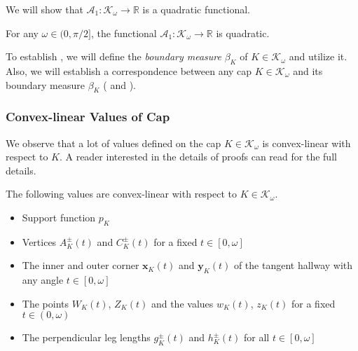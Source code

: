 We will show that \(\mathcal{A}_1 : \mathcal{K}_\omega \to \mathbb{R}\) is a quadratic functional.

\begin{theorem}

For any \(\omega \in (0, \pi/2]\), the functional \(\mathcal{A}_1 : \mathcal{K}_{\omega} \to \mathbb{R}\) is quadratic.

\label{thm:a1-quadratic}
\end{theorem}

To establish , we will define the \emph{boundary measure} \(\beta_K\) of \(K \in \mathcal{K}_\omega\) and utilize it. Also, we will establish a correspondence between any cap \(K \in \mathcal{K}_\omega\) and its boundary measure \(\beta_K\) ( and ).

\subsubsection{Convex-linear Values of Cap}

We observe that a lot of values defined on the cap \(K \in \mathcal{K}_\omega\) is convex-linear with respect to \(K\). A reader interested in the details of proofs can read  for the full details.

\begin{theorem}

The following values are convex-linear with respect to \(K \in \mathcal{K}_\omega\).

\begin{itemize}
\tightlist
\item
  Support function \(p_K\)
\item
  Vertices \(A^{\pm}_K(t)\) and \(C^{\pm}_K(t)\) for a fixed \(t \in [0, \omega]\)
\item
  The inner and outer corner \(\mathbf{x}_K(t)\) and \(\mathbf{y}_K(t)\) of the tangent hallway with any angle \(t \in [0, \omega]\)
\item
  The points \(W_K(t)\), \(Z_K(t)\) and the values \(w_K(t)\), \(z_K(t)\) for a fixed \(t \in (0, \omega)\)
\item
  The perpendicular leg lengths \(g^{\pm}_K(t)\) and \(h^{\pm}_K(t)\) for all \(t \in [0, \omega]\)
\end{itemize}

\label{thm:cap-convex-linear}
\end{theorem}

